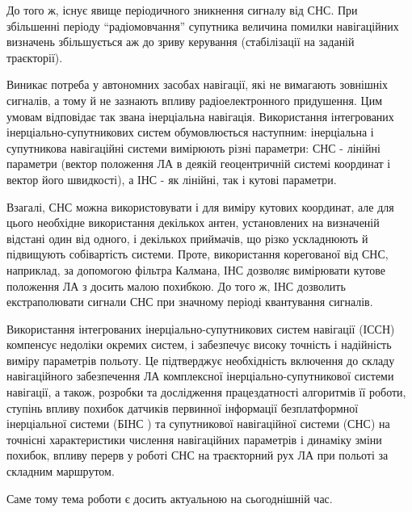 До того ж, існує явище періодичного зникнення сигналу від СНС. При  збільшенні 
періоду “радіомовчання” супутника величина помилки навігаційних визначень 
збільшується аж до зриву керування (стабілізації на заданій траєкторії).  

Виникає потреба у автономних засобах навігації, які не вимагають зовнішніх 
сигналів, а тому й не зазнають впливу радіоелектронного придушення. Цим 
умовам відповідає так звана інерціальна навігація. Використання інтегрованих 
інерціально-супутникових систем обумовлюється наступним: інерціальна і 
супутникова навігаційні системи вимірюють різні параметри: СНС - лінійні 
параметри (вектор положення ЛА в деякій геоцентричній системі координат і 
вектор його швидкості), а ІНС - як лінійні, так і кутові параметри. 

Взагалі, СНС можна використовувати і для виміру кутових координат, але для 
цього необхідне використання декількох антен, установлених на визначеній 
відстані один від одного, і декількох приймачів, що різко ускладнюють й 
підвищують собівартість системи. Проте, використання корегованої від СНС, 
наприклад, за допомогою фільтра Калмана, ІНС дозволяє вимірювати кутове 
положення ЛА з досить малою похибкою. До того ж, ІНС дозволить екстраполювати 
сигнали СНС при значному періоді квантування сигналів. 

Використання інтегрованих інерціально-супутникових систем навігації (ІССН) 
компенсує недоліки окремих систем, і забезпечує високу точність і надійність 
виміру параметрів польоту. Це підтверджує необхідність включення до складу 
навігаційного забезпечення ЛА комплексної інерціально-супутникової системи 
навігації, а також,  розробки та дослідження працездатності алгоритмів її 
роботи, ступінь впливу похибок датчиків первинної інформації  безплатформної 
інерціальної системи (БІНС ) 
та супутникової навігаційної системи (СНС) на 
точнісні характеристики числення навігаційних параметрів і динаміку зміни 
похибок, впливу перерв у роботі СНС на траєкторний рух ЛА при польоті за 
складним маршрутом.

Саме тому тема  роботи є досить актуальною на сьогоднішній час.